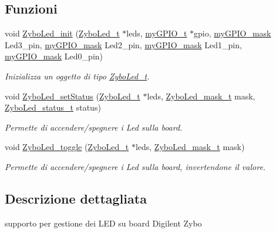 \subsection*{Funzioni}
\begin{DoxyCompactItemize}
\item 
void \hyperlink{group___led_ga51bccd37e6ae8cd32e2c50c60a5e83cc}{Zybo\+Led\+\_\+init} (\hyperlink{struct_zybo_led__t}{Zybo\+Led\+\_\+t} $\ast$leds, \hyperlink{structmy_g_p_i_o__t}{my\+G\+P\+I\+O\+\_\+t} $\ast$gpio, \hyperlink{group__bare-metal_ga402a0d20afc0cb7c25554b8b023f4253}{my\+G\+P\+I\+O\+\_\+mask} Led3\+\_\+pin, \hyperlink{group__bare-metal_ga402a0d20afc0cb7c25554b8b023f4253}{my\+G\+P\+I\+O\+\_\+mask} Led2\+\_\+pin, \hyperlink{group__bare-metal_ga402a0d20afc0cb7c25554b8b023f4253}{my\+G\+P\+I\+O\+\_\+mask} Led1\+\_\+pin, \hyperlink{group__bare-metal_ga402a0d20afc0cb7c25554b8b023f4253}{my\+G\+P\+I\+O\+\_\+mask} Led0\+\_\+pin)
\begin{DoxyCompactList}\small\item\em Inizializza un oggetto di tipo \hyperlink{struct_zybo_led__t}{Zybo\+Led\+\_\+t}. \end{DoxyCompactList}\item 
void \hyperlink{group___led_gacf5c2b0328c4bdf2d796397fc4510c69}{Zybo\+Led\+\_\+set\+Status} (\hyperlink{struct_zybo_led__t}{Zybo\+Led\+\_\+t} $\ast$leds, \hyperlink{group___led_gad11701cccac394f7e1f90de8f85695f3}{Zybo\+Led\+\_\+mask\+\_\+t} mask, \hyperlink{group___led_ga3dcb274f22e577705c49944b8d1f4b12}{Zybo\+Led\+\_\+status\+\_\+t} status)
\begin{DoxyCompactList}\small\item\em Permette di accendere/spegnere i Led sulla board. \end{DoxyCompactList}\item 
void \hyperlink{group___led_ga20ddd78a98b4c0123c5b964aa0a59046}{Zybo\+Led\+\_\+toggle} (\hyperlink{struct_zybo_led__t}{Zybo\+Led\+\_\+t} $\ast$leds, \hyperlink{group___led_gad11701cccac394f7e1f90de8f85695f3}{Zybo\+Led\+\_\+mask\+\_\+t} mask)
\begin{DoxyCompactList}\small\item\em Permette di accendere/spegnere i Led sulla board, invertendone il valore. \end{DoxyCompactList}\end{DoxyCompactItemize}


\subsection{Descrizione dettagliata}
supporto per gestione dei L\+E\+D su board Digilent Zybo 



